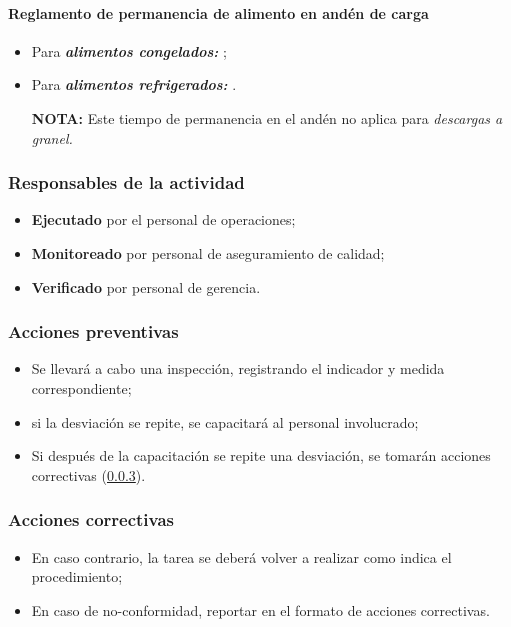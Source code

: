 \paragraph{Reglamento de permanencia de alimento en andén de carga}
\begin{itemize}
	\item Para \emph{\textbf{alimentos congelados:}} \TiempoAndenCong;
	\item Para \emph{\textbf{alimentos refrigerados:}} \TiempoAndenRefri.
	\item[\textbf{NOTA:}] Este tiempo de permanencia en el andén no aplica para \emph{descargas a granel.}
\end{itemize}

\subsubsection{Responsables de la actividad}
\begin{itemize}
	\item \textbf{Ejecutado} por el personal de operaciones;
	\item \textbf{Monitoreado} por personal de aseguramiento de calidad;
	\item \textbf{Verificado} por personal de gerencia.
\end{itemize}

\subsubsection{Acciones preventivas}
\begin{itemize}
	\item Se llevará a cabo una inspección, registrando el indicador y medida correspondiente;
	\item si la desviación se repite, se capacitará al personal involucrado;
	\item Si después de la capacitación se repite una desviación, se tomarán acciones correctivas (\cref{sec:2.1:acc}).
\end{itemize}

\subsubsection{Acciones correctivas}
\label{sec:2.1:acc}
\begin{itemize}
	\item En caso contrario, la tarea se deberá volver a realizar como indica el procedimiento;
	\item En caso de no-conformidad, reportar en el formato de acciones correctivas.
\end{itemize}

